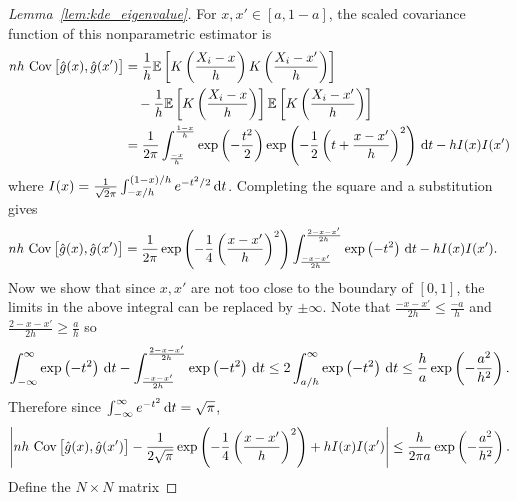 \begin{proof}[Lemma~\ref{lem:kde_eigenvalue}]

  For $x, x' \in [a, 1-a]$, the scaled covariance function
  of this nonparametric estimator is
  \begin{align*}
    n h\, \operatorname{Cov}\big[\hat g(x), \hat g(x')\big]
    &=
    \frac{1}{h}
    \mathbb{E} \left[
      K \left( \frac{X_i - x}{h} \right)
      K \left( \frac{X_i - x'}{h} \right)
    \right] \\
    &\quad-
    \frac{1}{h}
    \mathbb{E} \left[
      K \left( \frac{X_i - x}{h} \right)
    \right]
    \mathbb{E} \left[
      K \left( \frac{X_i - x'}{h} \right)
    \right] \\
    &=
    \frac{1}{2 \pi}
    \int_{\frac{-x}{h}}^{\frac{1-x}{h}}
    \exp \left( - \frac{t^2}{2} \right)
    \exp \left( - \frac{1}{2} \left( t + \frac{x - x'}{h} \right)^2 \right)
    \,\mathrm{d}t
    - h I(x) I(x')
  \end{align*}
  where
  $I(x) = \frac{1}{\sqrt 2 \pi} \int_{-x/h}^{(1-x)/h} e^{-t^2/2} \,\mathrm{d}t$.
  Completing the square and a substitution gives
  \begin{align*}
    n h\, \operatorname{Cov}\big[\hat g(x), \hat g(x')\big]
    &=
    \frac{1}{2 \pi}
    \exp \left( - \frac{1}{4} \left( \frac{x-x'}{h} \right)^2 \right)
    \int_{\frac{-x-x'}{2h}}^{\frac{2-x-x'}{2h}}
    \exp \left(-t^2\right)
    \,\mathrm{d}t
    - h I(x) I(x').
  \end{align*}
  Now we show that since $x, x'$ are not too close to the boundary
  of $[0,1]$,
  the limits in the above integral can be replaced by $\pm \infty$.
  Note that $\frac{-x-x'}{2h} \leq \frac{-a}{h}$
  and $\frac{2-x-x'}{2h} \geq \frac{a}{h}$ so
  \begin{align*}
    \int_{-\infty}^{\infty}
    \exp \left(-t^2\right)
    \,\mathrm{d}t
    - \int_{\frac{-x-x'}{2h}}^{\frac{2-x-x'}{2h}}
    \exp \left(-t^2\right)
    \,\mathrm{d}t
    \leq
    2 \int_{a/h}^\infty
    \exp \left(-t^2\right)
    \,\mathrm{d}t
    \leq
    \frac{h}{a}
    \exp \left(- \frac{a^2}{h^2}\right).
  \end{align*}
  Therefore since
  $\int_{-\infty}^{\infty} e^{-t^2} \,\mathrm{d}t = \sqrt \pi$,
  \begin{align*}
    \left|
    n h\, \operatorname{Cov}\big[\hat g(x), \hat g(x')\big]
    - \frac{1}{2 \sqrt \pi}
    \exp \left( - \frac{1}{4} \left( \frac{x-x'}{h} \right)^2 \right)
    + h I(x) I(x')
    \right|
    \leq
    \frac{h}{2 \pi a}
    \exp \left(- \frac{a^2}{h^2}\right).
  \end{align*}
  Define the $N \times N$ matrix

\end{proof}
